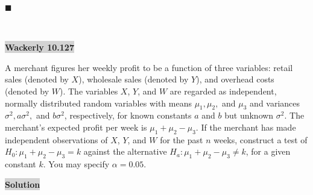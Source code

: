\documentclass[12pt]{article}
\newcommand{\mybox}{%
    \collectbox{%
        \setlength{\fboxsep}{2pt}%
        \fbox{\BOXCONTENT}%
    }%
}
\begin{document}
\hfill$\blacksquare$

\vfill
\begin{center}
\end{center}
\begin{center}
\vspace{-0.6cm}
\hrulefill \\
\vspace{-0.7cm}
\hrulefill
\end{center}

\pagebreak

\noindent\mybox{\colorbox{lightgray}{\textbf{Wackerly 10.127}}}\hspace{3mm}\hrulefill 

\noindent A merchant figures her weekly profit to be a function of three variables: retail sales (denoted by $X$), wholesale sales (denoted by $Y$), and overhead costs (denoted by $W$). The variables $X$, $Y$, and $W$ are regarded as independent, normally distributed random variables with means $\mu_1, \mu_2,$ and $\mu_3$ and variances $\sigma^2, a\sigma^2,$ and $b\sigma^2$, respectively, for known constants $a$ and $b$ but unknown $\sigma^2$. The merchant's expected profit per week is $\mu_1+\mu_2-\mu_3$. If the merchant has made independent observations of $X$, $Y$, and $W$ for the past $n$ weeks, construct a test of $H_0: \mu_1 + \mu_2 - \mu_3 = k$ against the alternative $H_a: \mu_1 + \mu_2 - \mu_3 \neq k$, for a given constant $k$. You may specify $\alpha = 0.05$. 

\noindent\mybox{\colorbox{lightgray}{\textbf{Solution}}} \hspace{3mm}\hrulefill
\end{document}
